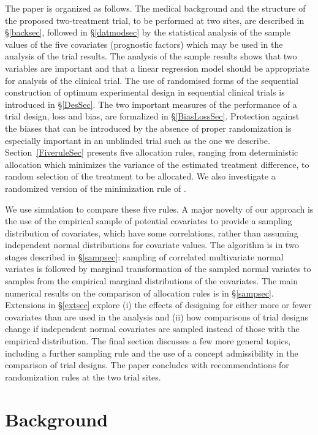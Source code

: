 \documentclass[number,12pt,review]{elsarticle}
\begin{document}
The paper is organized as follows. The medical background and the structure of the proposed two-treatment trial, to be performed at two sites,  are described in \S\ref{backsec}, followed in \S\ref{datmodsec} by the statistical analysis of the sample values of  the five covariates (prognostic factors)  which may be used in the analysis of the trial results. The analysis of the sample results shows that two variables are important and that a linear regression model should be appropriate for analysis of the clinical trial. The use of randomised forms of the sequential construction of optimum experimental design in sequential clinical trials is introduced in \S\ref{DesSec}. The two important measures of the performance of a trial design, loss and bias, are formalized in \S\ref{BiasLossSec}. Protection against the biases that can be introduced by the absence of proper randomization is especially important in an unblinded trial such as the one we describe. Section~\ref{FiveruleSec} presents five allocation rules, ranging from deterministic allocation which minimizes the variance of the estimated treatment difference, to random selection of the treatment to be allocated. We also investigate a randomized version of the minimization rule of \citet{p+s:75}.

We use simulation to compare these five rules. A major novelty of our approach is the use of the empirical sample of potential covariates to provide a sampling distribution of covariates, which have some correlations, rather than assuming independent normal distributions for covariate values. The algorithm is in two stages described in \S\ref{sampsec}: sampling of correlated multivariate normal variates is followed by marginal transformation of the sampled normal variates  to samples from the empirical marginal distributions of the covariates. The main numerical results on the comparison of allocation rules is in \S\ref{sampsec}. Extensions in \S\ref{extsec} explore (i) the effects of designing for either more or fewer covariates than are used in the analysis and (ii) how comparisons of trial designs change if  independent normal covariates are sampled instead of those with the empirical distribution. The final section discusses a few more general topics, including a further sampling rule and the use of a concept admissibility in the comparison of trial designs. The paper concludes with recommendations for randomization rules at the two trial sites.



\section{Background}
\end{document}
